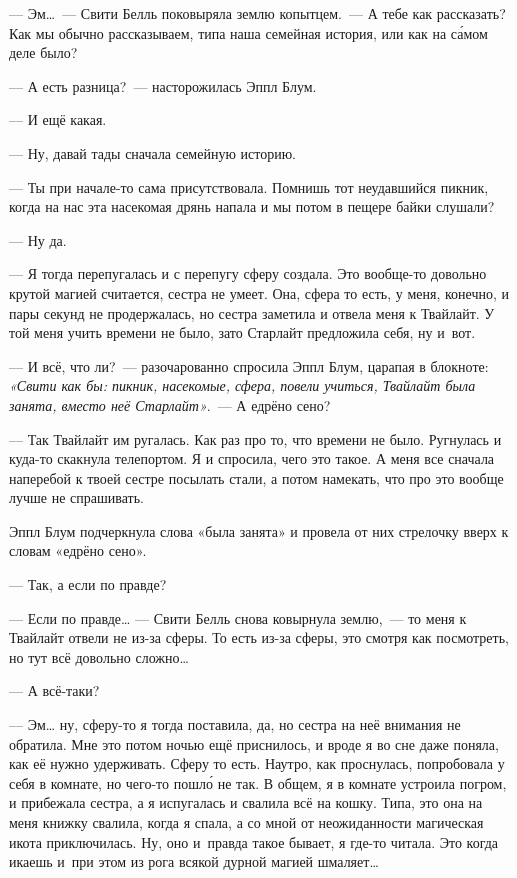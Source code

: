 \documentclass[fontsize=11pt,a5paper,titlepage=firstcover]{scrbook}
\begin{document}
--- Эм{\ldots}~--- Свити Белль поковыряла землю копытцем.~--- А тебе как рассказать? Как мы обычно рассказываем, типа наша семейная история, или как на са́мом деле было?

--- А есть разница?~--- насторожилась Эппл Блум.

--- И ещё какая.

--- Ну, давай тады сначала семейную историю.

--- Ты при начале-то сама присутствовала. Помнишь тот неудавшийся пикник, когда на нас эта насекомая дрянь напала и мы потом в пещере байки слушали?

--- Ну да.

--- Я тогда перепугалась и с перепугу сферу создала. Это вообще-то довольно крутой магией считается, сестра не умеет. Она, сфера то есть, у меня, конечно, и пары секунд не продержалась, но сестра заметила и отвела меня к Твайлайт. У той меня учить времени не было, зато Старлайт предложила себя, ну и~вот.

--- И всё, что ли?~--- разочарованно спросила Эппл Блум, царапая в блокноте: \emph{«Свити как бы: пикник, насекомые, сфера, повели учиться, Твайлайт была занята, вместо неё Старлайт»}.~--- А едрёно сено?

--- Так Твайлайт им ругалась. Как раз про то, что времени не было. Ругнулась и куда-то скакнула телепортом. Я и спросила, чего это такое. А меня все сначала наперебой к твоей сестре посылать стали, а потом намекать, что про это вообще лучше не спрашивать.

Эппл Блум подчеркнула слова «была занята» и провела от них стрелочку вверх к словам «едрёно сено».

--- Так, а если по правде?

--- Если по правде{\ldots} --- Свити Белль снова ковырнула землю,~--- то меня к Твайлайт отвели не из-за сферы. То есть из-за сферы, это смотря как посмотреть, но тут всё довольно сложно{\ldots}

--- А всё-таки?

--- Эм{\ldots} ну, сферу-то я тогда поставила, да, но сестра на неё внимания не обратила. Мне это потом ночью ещё приснилось, и вроде я во сне даже поняла, как её нужно удерживать. Сферу то есть. Наутро, как проснулась, попробовала у себя в комнате, но чего-то пошло́ не так. В общем, я в комнате устроила погром, и прибежала сестра, а я испугалась и свалила всё на кошку. Типа, это она на меня книжку свалила, когда я спала, а со мной от неожиданности магическая икота приключилась. Ну, оно и~правда такое бывает, я где-то читала. Это когда икаешь и~при этом из рога всякой дурной магией шмаляет{\ldots}
\end{document}
